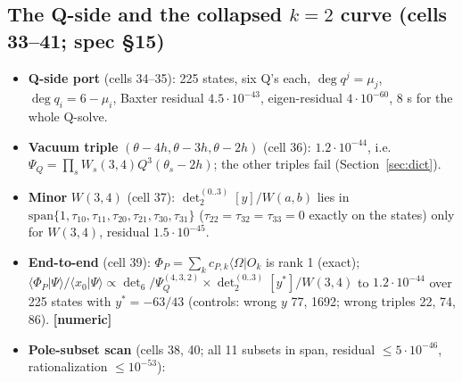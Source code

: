 \documentclass[11pt]{article}
\newcommand{\bra}[1]{\langle #1|}
\newcommand{\Om}{\Omega}
\newcommand{\nm}{\textbf{[numeric]}}
\begin{document}
\subsection{The Q-side and the collapsed $k=2$ curve (cells 33--41; spec \S15)}

\begin{itemize}
\item \textbf{Q-side port} (cells 34--35): 225 states, six Q's each, $\deg q^j=\mu_j$, $\deg q_i=6-\mu_i$, Baxter residual $4.5\cdot10^{-43}$, eigen-residual $4\cdot10^{-60}$, 8 s for the whole Q-solve.
\item \textbf{Vacuum triple} $(\theta-4h,\theta-3h,\theta-2h)$ (cell 36): $1.2\cdot10^{-44}$, i.e.\ $\Psi_Q=\prod_sW_s(3,4)Q^3(\theta_s-2h)$; the other triples fail (Section~\ref{sec:dict}).
\item \textbf{Minor} $W(3,4)$ (cell 37): $\det_2^{(0..3)}[y]/W(a,b)$ lies in $\mathrm{span}\{1,\tau_{10},\tau_{11},\tau_{20},\tau_{21},\tau_{30},\tau_{31}\}$ ($\tau_{22}=\tau_{32}=\tau_{33}=0$ exactly on the states) only for $W(3,4)$, residual $1.5\cdot10^{-45}$.
\item \textbf{End-to-end} (cell 39): $\Phi_P=\sum_kc_{P,k}\bra\Om O_k$ is rank 1 (exact); $\langle\Phi_P|\Psi\rangle/\langle x_0|\Psi\rangle\propto\det_6/\Psi_Q^{(4,3,2)}\times\det_2^{(0..3)}[y^*]/W(3,4)$ to $1.2\cdot10^{-44}$ over 225 states with $y^*=-63/43$ (controls: wrong $y$ 77, 1692; wrong triples 22, 74, 86). \nm
\item \textbf{Pole-subset scan} (cells 38, 40; all 11 subsets in span, residual $\le5\cdot10^{-46}$, rationalization $\le10^{-53}$):
\end{itemize}
\end{document}
